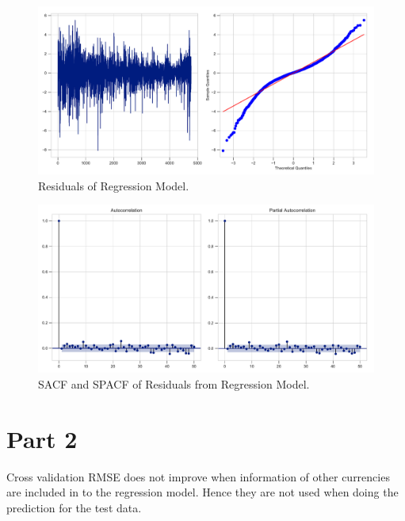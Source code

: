 \documentclass[]{article}
\begin{document}
%
\begin{figure}[ht]
	\centering
	\includegraphics[width=1\columnwidth]{../Figures/res_after_reg.pdf}
	\caption{Residuals of Regression Model.}
	\label{fig:res_after_reg}
\end{figure}
%
%
\begin{figure}[ht]
	\centering
	\includegraphics[width=1\columnwidth]{../Figures/sacf_n_spacf_after_reg.pdf}
	\caption{SACF and SPACF of Residuals from Regression Model.}
	\label{fig:sacf_n_spacf_after_reg}
\end{figure}
%

\section{Part 2}
Cross validation RMSE does not improve when information of other currencies are included in to the regression model. Hence they are not used when doing the prediction for the test data.
\end{document}
